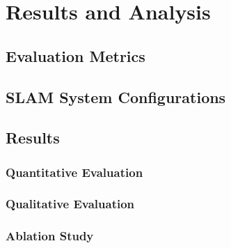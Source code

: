 \section{Results and Analysis}
\label{sec:experimental_results}
\label{sec:analysis}
\label{sec:observability_model_eval}
\label{sec:existence_confidence_eval}
\label{sec:orb_slam3_integration_eval}



\subsection{Evaluation Metrics}
\label{sec:eval_metrics}

\subsection{SLAM System Configurations}


\label{sec:parameter_tuning}

\subsection{Results}

\subsubsection{Quantitative Evaluation}

\subsubsection{Qualitative Evaluation}

\subsubsection{Ablation Study}

